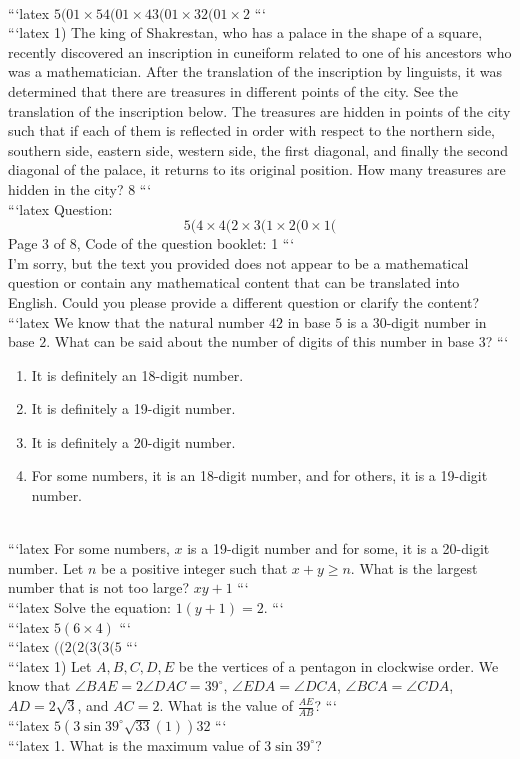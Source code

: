 \\
```latex
$5(01 \times 54(01 \times 43(01 \times 32(01 \times 2$
```
\\
```latex
1) The king of Shakrestan, who has a palace in the shape of a square, recently discovered an inscription in cuneiform related to one of his ancestors who was a mathematician. After the translation of the inscription by linguists, it was determined that there are treasures in different points of the city. See the translation of the inscription below. The treasures are hidden in points of the city such that if each of them is reflected in order with respect to the northern side, southern side, eastern side, western side, the first diagonal, and finally the second diagonal of the palace, it returns to its original position. How many treasures are hidden in the city? 8
```
\\
```latex
Question:
\[ 5(4 \times 4(2 \times 3(1 \times 2(0 \times 1( \]
Page 3 of 8, Code of the question booklet: 1
```
\\
I'm sorry, but the text you provided does not appear to be a mathematical question or contain any mathematical content that can be translated into English. Could you please provide a different question or clarify the content?
\\
```latex
We know that the natural number $42$ in base $5$ is a $30$-digit number in base $2$. What can be said about the number of digits of this number in base $3$?
```
\\
\begin{enumerate}
    \item It is definitely an 18-digit number.
    \item It is definitely a 19-digit number.
    \item It is definitely a 20-digit number.
    \item For some numbers, it is an 18-digit number, and for others, it is a 19-digit number.
\end{enumerate}
\\
```latex
For some numbers, $x$ is a 19-digit number and for some, it is a 20-digit number. Let $n$ be a positive integer such that $x + y \geq n$. What is the largest number that is not too large? $xy + 1$
```
\\
```latex
Solve the equation: $1(y + 1) = 2$.
```
\\
```latex
$5(6 \times 4)$
```
\\
```latex
$((2(2(3(3(5$
```
\\
```latex
1) Let \( A, B, C, D, E \) be the vertices of a pentagon in clockwise order. We know that \( \angle BAE = 2\angle DAC = 39^\circ \), \( \angle EDA = \angle DCA \), \( \angle BCA = \angle CDA \), \( AD = 2\sqrt{3} \), and \( AC = 2 \). What is the value of \( \frac{AE}{AB} \)?
```
\\
```latex
$5(3 \sin 39^\circ \sqrt{33} (1)) 32$
```
\\
```latex
1. What is the maximum value of $3 \sin 39^\circ$? 

